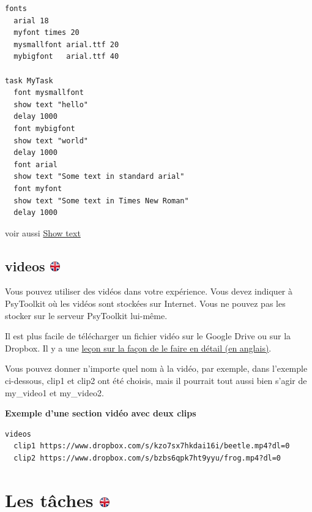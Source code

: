 \documentclass[
]{book}
\begin{document}
\begin{verbatim}
fonts
  arial 18
  myfont times 20
  mysmallfont arial.ttf 20
  mybigfont   arial.ttf 40

task MyTask
  font mysmallfont
  show text "hello"
  delay 1000
  font mybigfont
  show text "world"
  delay 1000
  font arial
  show text "Some text in standard arial"
  font myfont
  show text "Some text in Times New Roman"
  delay 1000
\end{verbatim}

voir aussi \protect\hyperlink{task-show-text}{Show text}

\hypertarget{videos}{%
\subsection[videos ]{\texorpdfstring{videos \href{https://www.psytoolkit.org/doc3.2.0/syntax.html\#videos}{\protect\includegraphics{img/ukflag.png}}}{videos }}\label{videos}}

Vous pouvez utiliser des vidéos dans votre expérience. Vous devez indiquer à PsyToolkit où les vidéos sont stockées sur Internet. Vous ne pouvez pas les stocker sur le serveur PsyToolkit lui-même.

Il est plus facile de télécharger un fichier vidéo sur le Google Drive ou sur la Dropbox. Il y a une \href{https://www.psytoolkit.org/lessons/video.html}{leçon sur la façon de le faire en détail (en anglais)}.

Vous pouvez donner n'importe quel nom à la vidéo, par exemple, dans l'exemple ci-dessous, clip1 et clip2 ont été choisis, mais il pourrait tout aussi bien s'agir de my\_video1 et my\_video2.

\textbf{Exemple d'une section vidéo avec deux clips}

\begin{verbatim}
videos
  clip1 https://www.dropbox.com/s/kzo7sx7hkdai16i/beetle.mp4?dl=0
  clip2 https://www.dropbox.com/s/bzbs6qpk7ht9yyu/frog.mp4?dl=0
\end{verbatim}

\hypertarget{les-tuxe2ches}{%
\section[Les tâches ]{\texorpdfstring{Les tâches \href{https://www.psytoolkit.org/doc3.2.0/syntax.html\#task}{\protect\includegraphics{img/ukflag.png}}}{Les tâches }}\label{les-tuxe2ches}}
\end{document}
